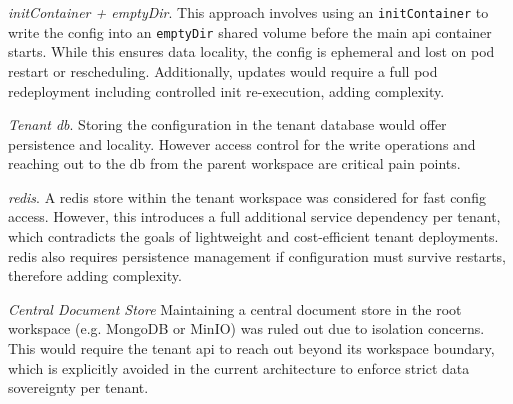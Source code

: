 \documentclass[11pt, a4paper, oneside, listof=totoc]{scrartcl}
\begin{document}
\begin{enumerate}[label={[\arabic*]:},
                    ref=Challenge~\arabic*,
                    leftmargin=*,
                    itemsep=0.6\baselineskip]
                    \item\label{chal:initContainer}
                        \textit{initContainer + emptyDir}.
                        This approach involves using an \texttt{initContainer} to write the config
                        into an \texttt{emptyDir} shared volume before the main \gls{api} container
                        starts.
                        While this ensures data locality, the config is ephemeral and lost on pod
                        restart or rescheduling.
                        Additionally, updates would require a full pod redeployment including
                        controlled init re-execution, adding complexity.

                    \item\label{chal:tenantDB}
                        \textit{Tenant \gls{db}}.
                        Storing the configuration in the tenant database would offer persistence and
                        locality.
                        However access control for the write operations and reaching out to the
                        \gls{db} from the parent workspace are critical pain points.

                    \item\label{chal:redis}
                        \textit{\gls{redis}}.
                        A \gls{redis} store within the tenant workspace was considered for fast config
                        access.
                        However, this introduces a full additional service dependency per tenant,
                        which contradicts the goals of lightweight and cost-efficient tenant
                        deployments.
                        \gls{redis} also requires persistence management if configuration must survive
                        restarts, therefore adding complexity.

                    \item\label{cahl:centralStore}
                        \textit{Central Document Store}
                        Maintaining a central document store in the root workspace (e.g. MongoDB or
                        MinIO) was ruled out due to isolation concerns.
                        This would require the tenant \gls{api} to reach out beyond its workspace
                        boundary, which is explicitly avoided in the current architecture to enforce
                        strict data sovereignty per tenant.
                \end{enumerate}
\end{document}
